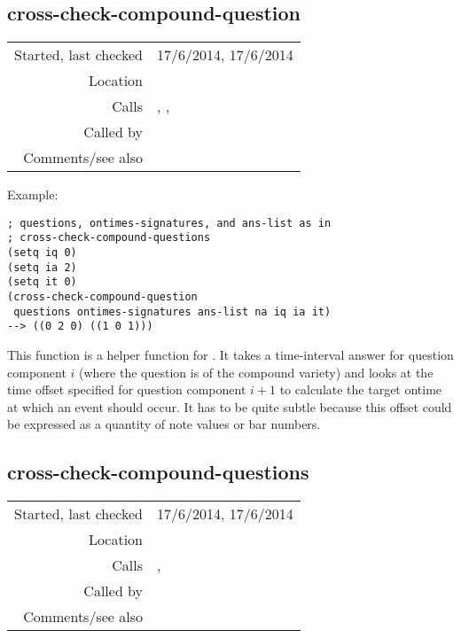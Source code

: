 \subsection*{cross-check-compound-question}\label{fun:cross-check-compound-question}

\vspace{0.3cm}
\begin{tabular}{r|p{8cm}}
Started, last checked & 17/6/2014, 17/6/2014 \\
Location & \nameref{sec:c@merata-processing} \\
Calls & \nameref{fun:bar-n-beat-number-of-ontime}, \nameref{fun:my-last}, \newline \nameref{fun:ontime-of-bar-n-beat-number} \\
Called by & \nameref{fun:cross-check-compound-questions} \\
Comments/see also &
\end{tabular}

\vspace{0.5cm}
\noindent Example:
\begin{verbatim}
; questions, ontimes-signatures, and ans-list as in
; cross-check-compound-questions
(setq iq 0)
(setq ia 2)
(setq it 0)
(cross-check-compound-question
 questions ontimes-signatures ans-list na iq ia it)
--> ((0 2 0) ((1 0 1)))
\end{verbatim}

\noindent This function is a helper function for
. It takes
a time-interval answer for question component $i$
(where the question is of the compound variety) and
looks at the time offset specified for question
component $i + 1$ to calculate the target ontime at
which an event should occur. It has to be quite
subtle because this offset could be expressed as a
quantity of note values or bar numbers.


\subsection*{cross-check-compound-questions}\label{fun:cross-check-compound-questions}

\vspace{0.3cm}
\begin{tabular}{r|p{8cm}}
Started, last checked & 17/6/2014, 17/6/2014 \\
Location & \nameref{sec:c@merata-processing} \\
Calls & \nameref{fun:cross-check-compound-question},\newline \nameref{fun:matching-pursuit} \\
Called by & \nameref{fun:Stravinsqi-Jun2014} \\
Comments/see also &
\end{tabular}

